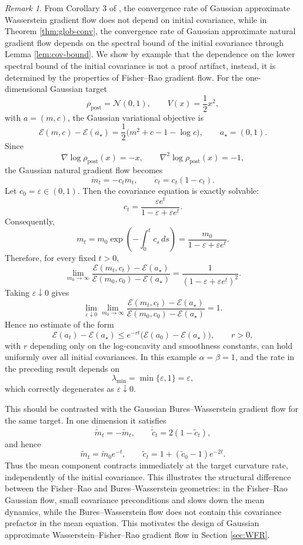 \documentclass[11pt]{article}
\theoremstyle{plain}
\theoremstyle{definition}
\theoremstyle{remark}
\newtheorem{remark}[theorem]{Remark}
\begin{document}
\begin{remark}
\label{rem:FR-init-cov}
From Corollary 3 of \cite{lambert2022variational}, the convergence rate of Gaussian approximate Wasserstein gradient flow does not depend on initial covariance, while in Theorem \ref{thm:glob-conv}, the convergence rate of Gaussian approximate natural gradient flow depends on the spectral bound of the initial covariance through Lemma \ref{lem:cov-bound}.
We show by example that the dependence on the lower spectral bound of the initial covariance is not a proof artifact, instead, it is determined by the properties of Fisher--Rao gradient flow. For the one-dimensional Gaussian target
\[
    \rho_{\mathrm{post}} = \mathcal N(0,1),
    \qquad
    V(x)=\frac12 x^2,
\]
with \(a=(m,c)\), the Gaussian variational objective is
\[
    \mathcal E(m,c)-\mathcal E(a_\star)
    =
    \frac12\bigl(m^2+c-1-\log c\bigr),
    \qquad
    a_\star=(0,1).
\]
Since
\[
    \nabla \log \rho_{\mathrm{post}}(x)=-x,
    \qquad
    \nabla^2 \log \rho_{\mathrm{post}}(x)=-1,
\]
the Gaussian natural gradient flow becomes
\[
    \dot m_t=-c_t m_t,
    \qquad
    \dot c_t=c_t(1-c_t).
\]
Let \(c_0=\varepsilon\in(0,1)\). Then the covariance equation is exactly solvable:
\[
    c_t=\frac{\varepsilon e^t}{1-\varepsilon+\varepsilon e^t}.
\]
Consequently,
\[
    m_t
    =
    m_0\exp\left(-\int_0^t c_s\,ds\right)
    =
    \frac{m_0}{1-\varepsilon+\varepsilon e^t}.
\]
Therefore, for every fixed \(t>0\),
\[
    \lim_{m_0\to\infty}
    \frac{\mathcal E(m_t,c_t)-\mathcal E(a_\star)}
         {\mathcal E(m_0,c_0)-\mathcal E(a_\star)}
    =
    \frac{1}{(1-\varepsilon+\varepsilon e^t)^2}.
\]
Taking \(\varepsilon\downarrow0\) gives
\[
    \lim_{\varepsilon\downarrow0}\lim_{m_0\to\infty}
    \frac{\mathcal E(m_t,c_t)-\mathcal E(a_\star)}
         {\mathcal E(m_0,c_0)-\mathcal E(a_\star)}
    =
    1.
\]
Hence no estimate of the form
\[
    \mathcal E(a_t)-\mathcal E(a_\star)
    \le
    e^{-rt}\bigl(\mathcal E(a_0)-\mathcal E(a_\star)\bigr),
    \qquad r>0,
\]
with \(r\) depending only on the log-concavity and smoothness constants, can hold uniformly over all initial covariances. In this example \(\alpha=\beta=1\), and the rate in the preceding result depends on
\[
    \lambda_{\min}=\min\{\varepsilon,1\}=\varepsilon,
\]
which correctly degenerates as \(\varepsilon\downarrow0\).

This should be contrasted with the Gaussian Bures--Wasserstein gradient flow for the same target. In one dimension it satisfies
\[
    \dot{\widetilde m}_t=-\widetilde m_t,
    \qquad
    \dot{\widetilde c}_t=2(1-\widetilde c_t),
\]
and hence
\[
    \widetilde m_t=\widetilde m_0e^{-t},
    \qquad
    \widetilde c_t=1+(\widetilde c_0-1)e^{-2t}.
\]
Thus the mean component contracts immediately at the target curvature rate, independently of the initial covariance. This illustrates the structural difference between the Fisher--Rao and Bures--Wasserstein geometries: in the Fisher--Rao Gaussian flow, small covariance preconditions and slows down the mean dynamics, while the Bures--Wasserstein flow does not contain this covariance prefactor in the mean equation. This motivates the design of Gaussian approximate Wasserstein--Fisher--Rao gradient flow in Section \ref{sec:WFR}.
\end{remark}
\end{document}
